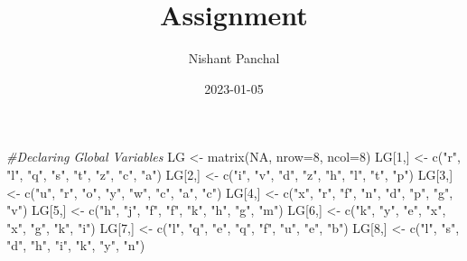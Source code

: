 \documentclass[
]{article}
\title{Assignment}
\author{Nishant Panchal}
\date{2023-01-05}
\newenvironment{Shaded}{\begin{snugshade}}{\end{snugshade}}
\newcommand{\AttributeTok}[1]{\textcolor[rgb]{0.77,0.63,0.00}{#1}}
\newcommand{\CommentTok}[1]{\textcolor[rgb]{0.56,0.35,0.01}{\textit{#1}}}
\newcommand{\ConstantTok}[1]{\textcolor[rgb]{0.00,0.00,0.00}{#1}}
\newcommand{\DecValTok}[1]{\textcolor[rgb]{0.00,0.00,0.81}{#1}}
\newcommand{\FunctionTok}[1]{\textcolor[rgb]{0.00,0.00,0.00}{#1}}
\newcommand{\NormalTok}[1]{#1}
\newcommand{\OtherTok}[1]{\textcolor[rgb]{0.56,0.35,0.01}{#1}}
\newcommand{\StringTok}[1]{\textcolor[rgb]{0.31,0.60,0.02}{#1}}
\begin{document}
\maketitle

\begin{Shaded}
\begin{Highlighting}[]
\CommentTok{\#Declaring Global Variables}
\NormalTok{LG }\OtherTok{\textless{}{-}} \FunctionTok{matrix}\NormalTok{(}\ConstantTok{NA}\NormalTok{, }\AttributeTok{nrow=}\DecValTok{8}\NormalTok{, }\AttributeTok{ncol=}\DecValTok{8}\NormalTok{)}
\NormalTok{LG[}\DecValTok{1}\NormalTok{,] }\OtherTok{\textless{}{-}} \FunctionTok{c}\NormalTok{(}\StringTok{"r"}\NormalTok{, }\StringTok{"l"}\NormalTok{, }\StringTok{"q"}\NormalTok{, }\StringTok{"s"}\NormalTok{, }\StringTok{"t"}\NormalTok{, }\StringTok{"z"}\NormalTok{, }\StringTok{"c"}\NormalTok{, }\StringTok{"a"}\NormalTok{)}
\NormalTok{LG[}\DecValTok{2}\NormalTok{,] }\OtherTok{\textless{}{-}} \FunctionTok{c}\NormalTok{(}\StringTok{"i"}\NormalTok{, }\StringTok{"v"}\NormalTok{, }\StringTok{"d"}\NormalTok{, }\StringTok{"z"}\NormalTok{, }\StringTok{"h"}\NormalTok{, }\StringTok{"l"}\NormalTok{, }\StringTok{"t"}\NormalTok{, }\StringTok{"p"}\NormalTok{)}
\NormalTok{LG[}\DecValTok{3}\NormalTok{,] }\OtherTok{\textless{}{-}} \FunctionTok{c}\NormalTok{(}\StringTok{"u"}\NormalTok{, }\StringTok{"r"}\NormalTok{, }\StringTok{"o"}\NormalTok{, }\StringTok{"y"}\NormalTok{, }\StringTok{"w"}\NormalTok{, }\StringTok{"c"}\NormalTok{, }\StringTok{"a"}\NormalTok{, }\StringTok{"c"}\NormalTok{)}
\NormalTok{LG[}\DecValTok{4}\NormalTok{,] }\OtherTok{\textless{}{-}} \FunctionTok{c}\NormalTok{(}\StringTok{"x"}\NormalTok{, }\StringTok{"r"}\NormalTok{, }\StringTok{"f"}\NormalTok{, }\StringTok{"n"}\NormalTok{, }\StringTok{"d"}\NormalTok{, }\StringTok{"p"}\NormalTok{, }\StringTok{"g"}\NormalTok{, }\StringTok{"v"}\NormalTok{)}
\NormalTok{LG[}\DecValTok{5}\NormalTok{,] }\OtherTok{\textless{}{-}} \FunctionTok{c}\NormalTok{(}\StringTok{"h"}\NormalTok{, }\StringTok{"j"}\NormalTok{, }\StringTok{"f"}\NormalTok{, }\StringTok{"f"}\NormalTok{, }\StringTok{"k"}\NormalTok{, }\StringTok{"h"}\NormalTok{, }\StringTok{"g"}\NormalTok{, }\StringTok{"m"}\NormalTok{)}
\NormalTok{LG[}\DecValTok{6}\NormalTok{,] }\OtherTok{\textless{}{-}} \FunctionTok{c}\NormalTok{(}\StringTok{"k"}\NormalTok{, }\StringTok{"y"}\NormalTok{, }\StringTok{"e"}\NormalTok{, }\StringTok{"x"}\NormalTok{, }\StringTok{"x"}\NormalTok{, }\StringTok{"g"}\NormalTok{, }\StringTok{"k"}\NormalTok{, }\StringTok{"i"}\NormalTok{)}
\NormalTok{LG[}\DecValTok{7}\NormalTok{,] }\OtherTok{\textless{}{-}} \FunctionTok{c}\NormalTok{(}\StringTok{"l"}\NormalTok{, }\StringTok{"q"}\NormalTok{, }\StringTok{"e"}\NormalTok{, }\StringTok{"q"}\NormalTok{, }\StringTok{"f"}\NormalTok{, }\StringTok{"u"}\NormalTok{, }\StringTok{"e"}\NormalTok{, }\StringTok{"b"}\NormalTok{)}
\NormalTok{LG[}\DecValTok{8}\NormalTok{,] }\OtherTok{\textless{}{-}} \FunctionTok{c}\NormalTok{(}\StringTok{"l"}\NormalTok{, }\StringTok{"s"}\NormalTok{, }\StringTok{"d"}\NormalTok{, }\StringTok{"h"}\NormalTok{, }\StringTok{"i"}\NormalTok{, }\StringTok{"k"}\NormalTok{, }\StringTok{"y"}\NormalTok{, }\StringTok{"n"}\NormalTok{)}


\end{Highlighting}
\end{Shaded}
\end{document}
